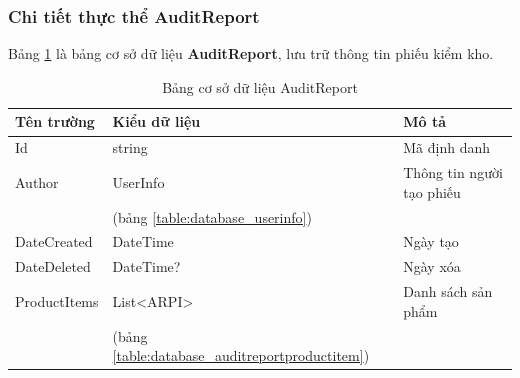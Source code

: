\documentclass[../DoAn.tex]{subfiles}
\begin{document}
\subsubsection{Chi tiết thực thể AuditReport}
\label{subsubsection:detaildesign-database-auditreport}
Bảng \ref{table:database_auditreport} là bảng cơ sở dữ liệu \textbf{AuditReport}, lưu trữ thông tin phiếu kiểm kho.
\begin{table}[H]
    \centering
    \begin{tabularx}{\textwidth}{|p{4cm}|p{3cm}|X|}
        \hline
        \textbf{Tên trường} & \textbf{Kiểu dữ liệu}                              & \textbf{Mô tả}            \\ \hline
        Id                  & string                                             & Mã định danh              \\ \hline
        Author              & UserInfo                                           & Thông tin người tạo phiếu \\
                            & (bảng \ref{table:database_userinfo})               &                           \\ \hline
        DateCreated         & DateTime                                           & Ngày tạo                  \\ \hline
        DateDeleted         & DateTime?                                          & Ngày xóa                  \\ \hline
        ProductItems        & List<ARPI>                                         & Danh sách sản phẩm        \\
                            & (bảng \ref{table:database_auditreportproductitem}) &                           \\ \hline
    \end{tabularx}
    \caption{Bảng cơ sở dữ liệu AuditReport}
    \label{table:database_auditreport}
\end{table}
\end{document}
